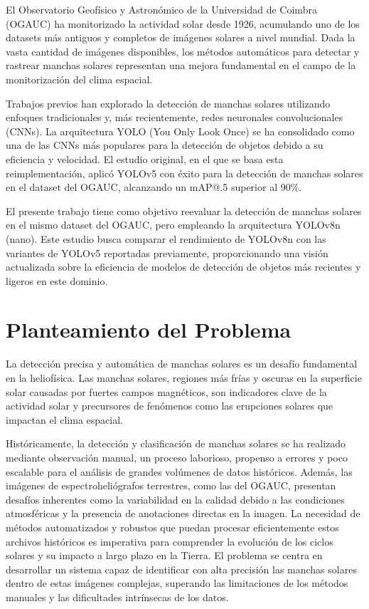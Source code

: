 \documentclass[journal]{IEEEtran}
\begin{document}
El Observatorio Geofísico y Astronómico de la Universidad de Coimbra (OGAUC) ha monitorizado la actividad solar desde 1926, acumulando uno de los datasets más antiguos y completos de imágenes solares a nivel mundial. Dada la vasta cantidad de imágenes disponibles, los métodos automáticos para detectar y rastrear manchas solares representan una mejora fundamental en el campo de la monitorización del clima espacial.

Trabajos previos han explorado la detección de manchas solares utilizando enfoques tradicionales y, más recientemente, redes neuronales convolucionales (CNNs). La arquitectura YOLO (You Only Look Once) se ha consolidado como una de las CNNs más populares para la detección de objetos debido a su eficiencia y velocidad. El estudio original, en el que se basa esta reimplementación, aplicó YOLOv5 con éxito para la detección de manchas solares en el dataset del OGAUC, alcanzando un mAP@.5 superior al 90\%.

El presente trabajo tiene como objetivo reevaluar la detección de manchas solares en el mismo dataset del OGAUC, pero empleando la arquitectura YOLOv8n (nano). Este estudio busca comparar el rendimiento de YOLOv8n con las variantes de YOLOv5 reportadas previamente, proporcionando una visión actualizada sobre la eficiencia de modelos de detección de objetos más recientes y ligeros en este dominio.

\section{Planteamiento del Problema}
La detección precisa y automática de manchas solares es un desafío fundamental en la heliofísica. Las manchas solares, regiones más frías y oscuras en la superficie solar causadas por fuertes campos magnéticos, son indicadores clave de la actividad solar y precursores de fenómenos como las erupciones solares que impactan el clima espacial.

Históricamente, la detección y clasificación de manchas solares se ha realizado mediante observación manual, un proceso laborioso, propenso a errores y poco escalable para el análisis de grandes volúmenes de datos históricos. Además, las imágenes de espectroheliógrafos terrestres, como las del OGAUC, presentan desafíos inherentes como la variabilidad en la calidad debido a las condiciones atmosféricas y la presencia de anotaciones directas en la imagen. La necesidad de métodos automatizados y robustos que puedan procesar eficientemente estos archivos históricos es imperativa para comprender la evolución de los ciclos solares y su impacto a largo plazo en la Tierra. El problema se centra en desarrollar un sistema capaz de identificar con alta precisión las manchas solares dentro de estas imágenes complejas, superando las limitaciones de los métodos manuales y las dificultades intrínsecas de los datos.
\end{document}
